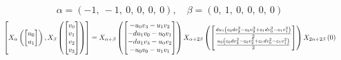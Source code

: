 \documentclass[11pt]{article}
\theoremstyle{definition}
\begin{document}
\[
\alpha = \left( -1, \  -1, \  0, \  0, \  0, \  0\right), \quad \beta = \left( 0, \  1, \  0, \  0, \  0, \  0\right)
\]
\[
\scaletoalign{\textwidth}{\left[ X_{\alpha}\left(\left[\begin{matrix}u_{0}\\u_{1}\end{matrix}\right]\right), X_{\beta}\left(\left[\begin{matrix}v_{0}\\v_{1}\\v_{2}\\v_{3}\end{matrix}\right]\right) \right] = X_{\alpha + \beta}\left(\left[\begin{matrix}- u_{0} v_{3} - u_{1} v_{2}\\- d u_{1} v_{0} - u_{0} v_{1}\\- d u_{1} v_{3} - u_{0} v_{2}\\- u_{0} v_{0} - u_{1} v_{1}\end{matrix}\right]\right) X_{\alpha + 2\beta}\left(\left[\begin{matrix}\frac{d u_{1} \left(c_{0} d v_{3}^{2} - c_{0} v_{2}^{2} + c_{1} d v_{0}^{2} - c_{1} v_{1}^{2}\right)}{2}\\\frac{u_{0} \left(c_{0} d v_{3}^{2} - c_{0} v_{2}^{2} + c_{1} d v_{0}^{2} - c_{1} v_{1}^{2}\right)}{2}\end{matrix}\right]\right) X_{2\alpha + 2\beta}\left(0\right)}
\]
\end{document}
